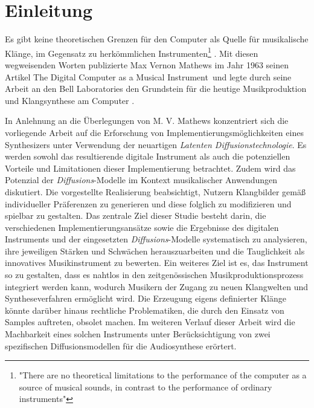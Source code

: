 \documentclass[
  a4paper,  %
  twoside,  %
  bibliography=totoc,
  headsepline,
  cleardoublepage=empty,
  parskip=half,
  draft=false
]{scrbook}
\begin{document}
%
%


\chapter{Einleitung}
\label{sec:introduction}

\glqq Es gibt keine theoretischen Grenzen für den Computer als Quelle für musikalische Klänge, im Gegensatz zu herkömmlichen Instrumenten\grqq \footnote{"There are no theoretical limitations to the performance of the computer as a source of musical sounds, in contrast to the performance of ordinary instruments"} \cite{mathews_digital_1963}. Mit diesen wegweisenden Worten publizierte Max Vernon Mathews im Jahr 1963 seinen Artikel \glqq The Digital Computer as a Musical Instrument\grqq \, und legte durch seine Arbeit an den Bell Laboratories den Grundstein für die heutige Musikproduktion und Klangsynthese am Computer \cite{mathews_music_2004}.

In Anlehnung an die Überlegungen von M. V. Mathews konzentriert sich die vorliegende Arbeit auf die Erforschung von Implementierungsmöglichkeiten eines Synthesizers unter Verwendung der neuartigen \emph{Latenten Diffusionstechnologie}. Es werden sowohl das resultierende digitale Instrument als auch die potenziellen Vorteile und Limitationen dieser Implementierung betrachtet. Zudem wird das Potenzial der \emph{Diffusions}-Modelle im Kontext musikalischer Anwendungen diskutiert. Die vorgestellte Realisierung beabsichtigt, Nutzern Klangbilder gemäß individueller Präferenzen zu generieren und diese folglich zu modifizieren und spielbar zu gestalten. Das zentrale Ziel dieser Studie besteht darin, die verschiedenen Implementierungsansätze sowie die Ergebnisse des digitalen Instruments und der eingesetzten \emph{Diffusions}-Modelle systematisch zu analysieren, ihre jeweiligen Stärken und Schwächen herauszuarbeiten und die Tauglichkeit als innovatives Musikinstrument zu bewerten. Ein weiteres Ziel ist es, das Instrument so zu gestalten, dass es nahtlos in den zeitgenössischen Musikproduktionsprozess integriert werden kann, wodurch Musikern der Zugang zu neuen Klangwelten und Syntheseverfahren ermöglicht wird. Die Erzeugung eigens definierter Klänge könnte darüber hinaus rechtliche Problematiken, die durch den Einsatz von Samples auftreten, obsolet machen. Im weiteren Verlauf dieser Arbeit wird die Machbarkeit eines solchen Instruments unter Berücksichtigung von zwei spezifischen Diffusionsmodellen für die Audiosynthese erörtert.
\end{document}

